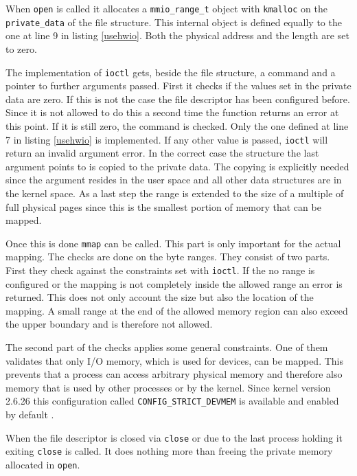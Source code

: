 \documentclass[
a4paper,
12pt,
notitlepage,
parskip=half,
DIV=11,
]{scrbook}
\begin{document}
		When \texttt{open} is called it allocates a \texttt{mmio\_range\_t} object with \texttt{kmalloc} on the \texttt{private\_data} of the file structure.
		This internal object is defined equally to the one at line 9 in listing \ref{usehwio}.
		Both the physical address and the length are set to zero.
		
		The implementation of \texttt{ioctl} gets, beside the file structure, a command and a pointer to further arguments passed.
		First it checks if the values set in the private data are zero.
		If this is not the case the file descriptor has been configured before.
		Since it is not allowed to do this a second time the function returns an error at this point.
		If it is still zero, the command is checked.
		Only the one defined at line 7 in listing \ref{usehwio} is implemented.
		If any other value is passed, \texttt{ioctl} will return an invalid argument error.
		In the correct case the structure the last argument points to is copied to the private data.
		The copying is explicitly needed since the argument resides in the user space and all other data structures are in the kernel space.
		As a last step the range is extended to the size of a multiple of full physical pages since this is the smallest portion of memory that can be mapped.
		
		Once this is done \texttt{mmap} can be called.
		This part is only important for the actual mapping.
		The checks are done on the byte ranges.
		They consist of two parts.
		First they check against the constraints set with \texttt{ioctl}.
		If the no range is configured or the mapping is not completely inside the allowed range an error is returned.
		This does not only account the size but also the location of the mapping.
		A small range at the end of the allowed memory region can also exceed the upper boundary and is therefore not allowed.
		
		The second part of the checks applies some general constraints.
		One of them validates that only I/O memory, which is used for devices, can be mapped.
		This prevents that a process can access arbitrary physical memory and therefore also memory that is used by other processes or by the kernel.
		Since kernel version 2.6.26 this configuration called \texttt{CONFIG\_STRICT\_DEVMEM} is available and enabled by default \citep{devmem}.
		
		When the file descriptor is closed via \texttt{close} or due to the last process holding it exiting \texttt{close} is called.
		It does nothing more than freeing the private memory allocated in \texttt{open}.
		
\end{document}
